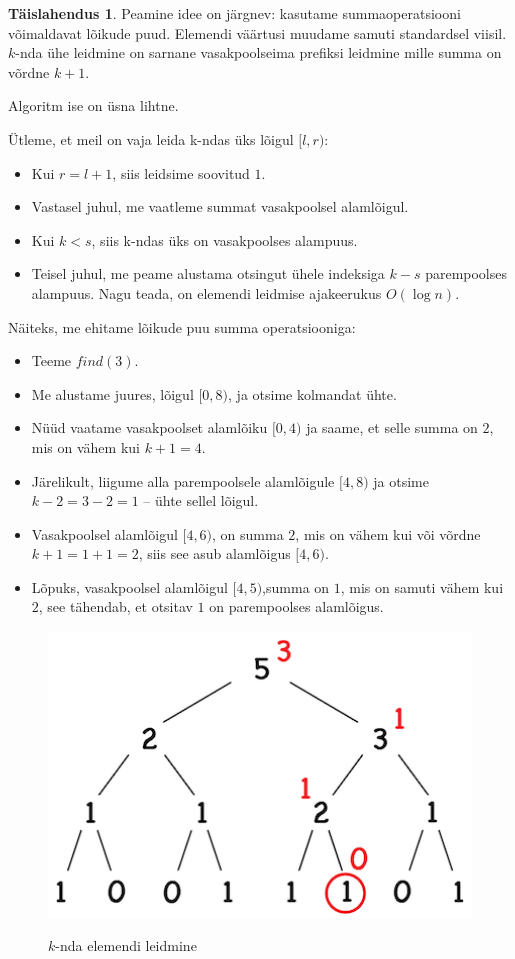 \documentclass{trkut}
\theoremstyle{definition}
\newtheorem*{solution}{Täislahendus}
\begin{document}
\begin{solution}
Peamine idee on järgnev: kasutame summaoperatsiooni võimaldavat lõikude puud. Elemendi väärtusi muudame samuti standardsel viisil. 
$k$-nda ühe leidmine on sarnane vasakpoolseima prefiksi leidmine mille summa on võrdne $k+1$. 

Algoritm ise on üsna lihtne.

Ütleme, et meil on vaja leida k-ndas üks lõigul $[l,r)$:
\begin{itemize}
\item Kui $r=l+1$, siis leidsime soovitud $1$. 
\item Vastasel juhul, me vaatleme summat vasakpoolsel alamlõigul. 
\item Kui $k<s$, siis k-ndas üks on vasakpoolses alampuus. 
\item Teisel juhul, me peame alustama otsingut ühele indeksiga $k−s$ parempoolses alampuus. Nagu teada, on elemendi leidmise ajakeerukus $O(\log n)$. 
\end{itemize}
Näiteks, me ehitame lõikude puu summa operatsiooniga:
\begin{itemize}
\item Teeme $find(3)$. 
\item Me alustame juures, lõigul $[0,8)$, ja otsime kolmandat ühte. 
\item Nüüd vaatame vasakpoolset alamlõiku $[0,4)$ ja saame, et selle summa on $2$, mis on vähem kui $k+1=4$. 
\item Järelikult, liigume alla parempoolsele alamlõigule $[4,8)$ ja otsime $k−2=3−2=1$ -- ühte sellel lõigul.
\item Vasakpoolsel alamlõigul $[4,6)$, on summa $2$, mis on vähem kui või võrdne $k+1=1+1=2$, siis see asub alamlõigus $[4,6)$.
\item Lõpuks, vasakpoolsel alamlõigul $[4,5)$,summa on $1$, mis on samuti vähem kui $2$, see tähendab, et otsitav $1$ on parempoolses alamlõigus.
\end{itemize}

\begin{figure}[H]%
    \includegraphics[width=12cm]{kth.png}%
    \caption{$k$-nda elemendi leidmine}%
    \label{joonis}%
\end{figure}
\end{solution}
\end{document}
